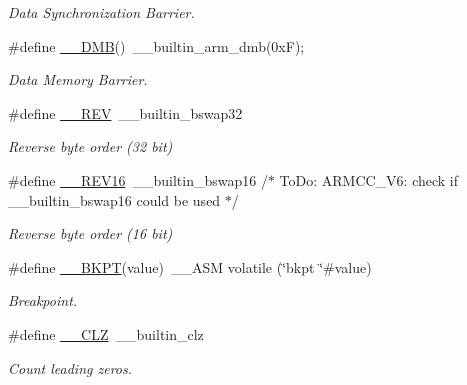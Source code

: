 \begin{DoxyCompactItemize}
\begin{DoxyCompactList}\small\item\em Data Synchronization Barrier. \end{DoxyCompactList}\item 
\#define \hyperlink{group___c_m_s_i_s___core___instruction_interface_ga671101179b5943990785f36f8c1e2269}{\+\_\+\+\_\+\+D\+MB}()~\+\_\+\+\_\+builtin\+\_\+arm\+\_\+dmb(0x\+F);
\begin{DoxyCompactList}\small\item\em Data Memory Barrier. \end{DoxyCompactList}\item 
\#define \hyperlink{group___c_m_s_i_s___core___instruction_interface_ga14f54807872c0f5e05604c4924abfdae}{\+\_\+\+\_\+\+R\+EV}~\+\_\+\+\_\+builtin\+\_\+bswap32
\begin{DoxyCompactList}\small\item\em Reverse byte order (32 bit) \end{DoxyCompactList}\item 
\#define \hyperlink{group___c_m_s_i_s___core___instruction_interface_ga4e3acd41e7667cdf65ffcd8c76a8613f}{\+\_\+\+\_\+\+R\+E\+V16}~\+\_\+\+\_\+builtin\+\_\+bswap16                           /$\ast$ To\+Do\+:  A\+R\+M\+C\+C\+\_\+\+V6\+: check if \+\_\+\+\_\+builtin\+\_\+bswap16 could be used $\ast$/
\begin{DoxyCompactList}\small\item\em Reverse byte order (16 bit) \end{DoxyCompactList}\item 
\#define \hyperlink{group___c_m_s_i_s___core___instruction_interface_ga15ea6bd3c507d3e81c3b3a1258e46397}{\+\_\+\+\_\+\+B\+K\+PT}(value)~\+\_\+\+\_\+\+A\+SM volatile (\char`\"{}bkpt \char`\"{}\#value)
\begin{DoxyCompactList}\small\item\em Breakpoint. \end{DoxyCompactList}\item 
\#define \hyperlink{group___c_m_s_i_s___core___instruction_interface_ga5d5bb1527e042be4a9fa5a33f65cc248}{\+\_\+\+\_\+\+C\+LZ}~\+\_\+\+\_\+builtin\+\_\+clz
\begin{DoxyCompactList}\small\item\em Count leading zeros. \end{DoxyCompactList}\item 
\mbox{\label{group___c_m_s_i_s___core___instruction_interface_gabc17e391c13c71702366c67cba39c276}} 

\end{DoxyCompactItemize}
